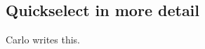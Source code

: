 \begin{abstrsyn}
\begin{comment}
Assuming \texttt{l} contains $n$ elements, this optimization changes the
asymptotic complexity from expected (randomized) $\Theta(n \cdot m)$ to
$\Theta(n\log{n} + m\log{n})$, which for any $m \approx n$ reduces the
complexity from $\Theta (n^2)$ to $\Theta(n\log{n})$---a significant improvement. 

In this paper, we develop a splitting algorithm
(\ref{sec:splitting,sec:implementation}) which, given a program $e$ in \lang,
produces an equivalent pair of programs which correspond precisely to the two
stages of computation in $e$.
(Splitting is always possible because the staging annotations in $e$ are
consistent, because $e$ is well-typed in \lang.) In the case of
\texttt{qsStaged}, our splitting algorithm produces the algorithm described
above.
\end{comment}





\subsection{Quickselect in more detail}

Carlo writes this.



\end{abstrsyn}
